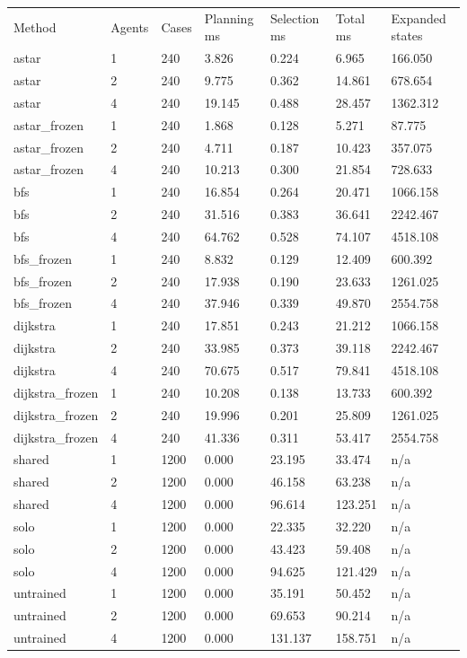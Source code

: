 \documentclass[10pt,a4paper]{article}
\begin{document}
{\footnotesize\begin{longtable}{p{}p{}p{}p{}p{}p{}p{}}
Method & Agents & Cases & Planning ms & Selection ms & Total ms & Expanded states \\
astar & 1 & 240 & 3.826 & 0.224 & 6.965 & 166.050 \\
astar & 2 & 240 & 9.775 & 0.362 & 14.861 & 678.654 \\
astar & 4 & 240 & 19.145 & 0.488 & 28.457 & 1362.312 \\
astar\_frozen & 1 & 240 & 1.868 & 0.128 & 5.271 & 87.775 \\
astar\_frozen & 2 & 240 & 4.711 & 0.187 & 10.423 & 357.075 \\
astar\_frozen & 4 & 240 & 10.213 & 0.300 & 21.854 & 728.633 \\
bfs & 1 & 240 & 16.854 & 0.264 & 20.471 & 1066.158 \\
bfs & 2 & 240 & 31.516 & 0.383 & 36.641 & 2242.467 \\
bfs & 4 & 240 & 64.762 & 0.528 & 74.107 & 4518.108 \\
bfs\_frozen & 1 & 240 & 8.832 & 0.129 & 12.409 & 600.392 \\
bfs\_frozen & 2 & 240 & 17.938 & 0.190 & 23.633 & 1261.025 \\
bfs\_frozen & 4 & 240 & 37.946 & 0.339 & 49.870 & 2554.758 \\
dijkstra & 1 & 240 & 17.851 & 0.243 & 21.212 & 1066.158 \\
dijkstra & 2 & 240 & 33.985 & 0.373 & 39.118 & 2242.467 \\
dijkstra & 4 & 240 & 70.675 & 0.517 & 79.841 & 4518.108 \\
dijkstra\_frozen & 1 & 240 & 10.208 & 0.138 & 13.733 & 600.392 \\
dijkstra\_frozen & 2 & 240 & 19.996 & 0.201 & 25.809 & 1261.025 \\
dijkstra\_frozen & 4 & 240 & 41.336 & 0.311 & 53.417 & 2554.758 \\
shared & 1 & 1200 & 0.000 & 23.195 & 33.474 & n/a \\
shared & 2 & 1200 & 0.000 & 46.158 & 63.238 & n/a \\
shared & 4 & 1200 & 0.000 & 96.614 & 123.251 & n/a \\
solo & 1 & 1200 & 0.000 & 22.335 & 32.220 & n/a \\
solo & 2 & 1200 & 0.000 & 43.423 & 59.408 & n/a \\
solo & 4 & 1200 & 0.000 & 94.625 & 121.429 & n/a \\
untrained & 1 & 1200 & 0.000 & 35.191 & 50.452 & n/a \\
untrained & 2 & 1200 & 0.000 & 69.653 & 90.214 & n/a \\
untrained & 4 & 1200 & 0.000 & 131.137 & 158.751 & n/a \\
\end{longtable}}
\end{document}
